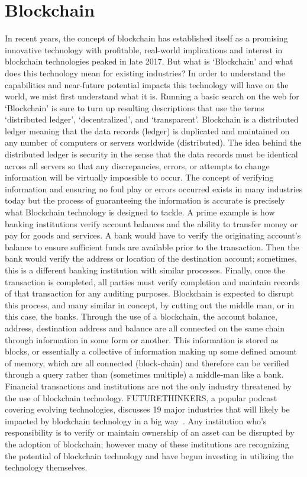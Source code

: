 \section{Blockchain}
In recent years, the concept of blockchain has established itself as a
promising innovative technology with profitable, real-world implications and
interest in blockchain technologies peaked in late 2017. But what is
`Blockchain' and what does this technology mean for existing industries? In
order to understand the capabilities and near-future potential impacts this
technology will have on the world, we mist first understand what it is. Running
a basic search on the web for `Blockchain' is sure to turn up resulting
descriptions that use the terms `distributed ledger', `decentralized', and
`transparent'. Blockchain is a distributed ledger meaning that the data records
(ledger) is duplicated and maintained on any number of computers or servers
worldwide (distributed). The idea behind the distributed ledger is security in
the sense that the data records must be identical across all servers so that
any discrepancies, errors, or attempts to change information will be virtually
impossible to occur. The concept of verifying information and ensuring no foul
play or errors occurred exists in many industries today but the process of
guaranteeing the information is accurate is precisely what Blockchain
technology is designed to tackle. A prime example is how banking institutions
verify account balances and the ability to transfer money or pay for goods and
services. A bank would have to verify the originating account's balance to
ensure sufficient funds are available prior to the transaction. Then the bank
would verify the address or location of the destination account; sometimes,
this is a different banking institution with similar processes. Finally, once
the transaction is completed, all parties must verify completion and maintain
records of that transaction for any auditing purposes. Blockchain is expected
to disrupt this process, and many similar in concept, by cutting out the middle
man, or in this case, the banks. Through the use of a blockchain, the account
balance, address, destination address and balance are all connected on the same
chain through information in some form or another. This information is stored
as blocks, or essentially a collective of information making up some defined
amount of memory, which are all connected (block-chain) and therefore can be
verified through a query rather than (sometimes multiple) a middle-man like a
bank. Financial transactions and institutions are not the only industry
threatened by the use of blockchain technology. FUTURETHINKERS, a popular
podcast covering evolving technologies, discusses 19 major industries that will
likely be impacted by blockchain technology in a big way~\cite{FutureThinkers}.
Any institution who's responsibility is to verify or maintain ownership of an
asset can be disrupted by the adoption of blockchain; however many of these
institutions are recognizing the potential of blockchain technology and have
begun investing in utilizing the technology themselves. 

